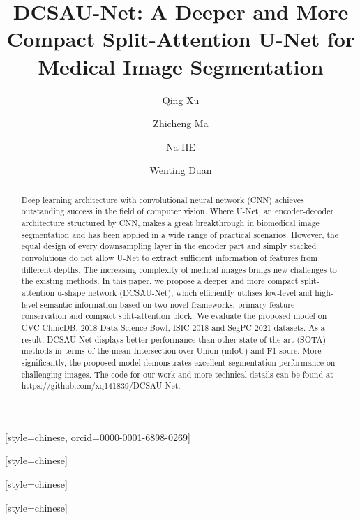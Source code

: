 \documentclass[a4paper,fleqn]{cas-dc}
\begin{document}
\let\WriteBookmarks\relax
\def\floatpagepagefraction{1}
\def\textpagefraction{.001}

\shorttitle{}


\title [mode = title]{DCSAU-Net: A Deeper and More Compact Split-Attention U-Net for Medical Image Segmentation}                      







\author[1]{Qing Xu}[style=chinese, orcid=0000-0001-6898-0269]

\cormark[1]











\author[2]{Zhicheng Ma}[style=chinese]

\author[3]{Na HE}[style=chinese]






\author [1]
{Wenting Duan}[style=chinese]










\begin{abstract}
Deep learning architecture with convolutional neural network (CNN) achieves outstanding success in the field of computer vision. Where U-Net, an encoder-decoder architecture structured by CNN, makes a great breakthrough in biomedical image segmentation and has been applied in a wide range of practical scenarios. However, the equal design of every downsampling layer in the encoder part and simply stacked convolutions do not allow U-Net to extract sufficient information of features from different depths. The increasing complexity of medical images brings new challenges to the existing methods. In this paper, we propose a deeper and more compact split-attention u-shape network (DCSAU-Net), which efficiently utilises low-level and high-level semantic information based on two novel frameworks: primary feature conservation and compact split-attention block. We evaluate the proposed model on CVC-ClinicDB, 2018 Data Science Bowl, ISIC-2018 and SegPC-2021 datasets. As a result, DCSAU-Net displays better performance than other state-of-the-art (SOTA) methods in terms of the mean Intersection over Union (mIoU) and F1-socre. More significantly, the proposed model demonstrates excellent segmentation performance on challenging images. The code for our work and more technical details can be found at https://github.com/xq141839/DCSAU-Net.




\end{abstract}
\end{document}
